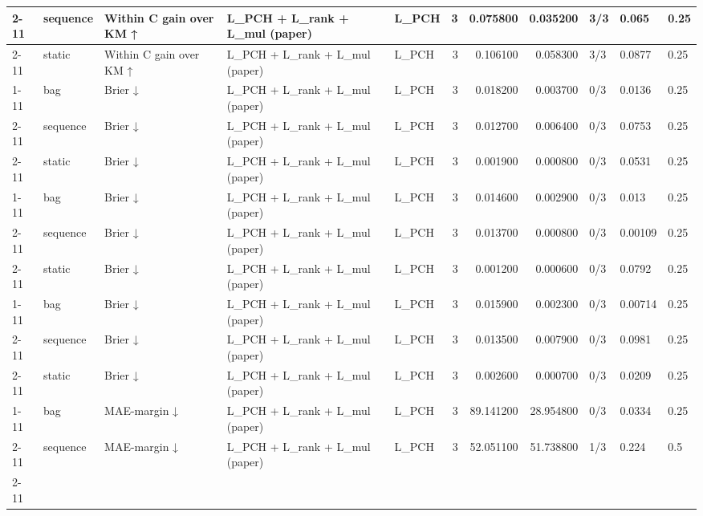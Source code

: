 \begin{tabular}{lllllrrrlll}
\cline{2-11} \cline{3-11}
 & sequence & Within C gain over KM ↑ & L\_PCH + L\_rank + L\_mul (paper) & L\_PCH & 3 & 0.075800 & 0.035200 & 3/3 & 0.065 & 0.25 \\
\cline{2-11} \cline{3-11}
 & static & Within C gain over KM ↑ & L\_PCH + L\_rank + L\_mul (paper) & L\_PCH & 3 & 0.106100 & 0.058300 & 3/3 & 0.0877 & 0.25 \\
\cline{1-11} \cline{2-11} \cline{3-11}
\multirow[t]{3}{*}{ehrsim\_base} & bag & Brier ↓ & L\_PCH + L\_rank + L\_mul (paper) & L\_PCH & 3 & 0.018200 & 0.003700 & 0/3 & 0.0136 & 0.25 \\
\cline{2-11} \cline{3-11}
 & sequence & Brier ↓ & L\_PCH + L\_rank + L\_mul (paper) & L\_PCH & 3 & 0.012700 & 0.006400 & 0/3 & 0.0753 & 0.25 \\
\cline{2-11} \cline{3-11}
 & static & Brier ↓ & L\_PCH + L\_rank + L\_mul (paper) & L\_PCH & 3 & 0.001900 & 0.000800 & 0/3 & 0.0531 & 0.25 \\
\cline{1-11} \cline{2-11} \cline{3-11}
\multirow[t]{3}{*}{ehrsim\_static} & bag & Brier ↓ & L\_PCH + L\_rank + L\_mul (paper) & L\_PCH & 3 & 0.014600 & 0.002900 & 0/3 & 0.013 & 0.25 \\
\cline{2-11} \cline{3-11}
 & sequence & Brier ↓ & L\_PCH + L\_rank + L\_mul (paper) & L\_PCH & 3 & 0.013700 & 0.000800 & 0/3 & 0.00109 & 0.25 \\
\cline{2-11} \cline{3-11}
 & static & Brier ↓ & L\_PCH + L\_rank + L\_mul (paper) & L\_PCH & 3 & 0.001200 & 0.000600 & 0/3 & 0.0792 & 0.25 \\
\cline{1-11} \cline{2-11} \cline{3-11}
\multirow[t]{3}{*}{ehrsim\_temporal} & bag & Brier ↓ & L\_PCH + L\_rank + L\_mul (paper) & L\_PCH & 3 & 0.015900 & 0.002300 & 0/3 & 0.00714 & 0.25 \\
\cline{2-11} \cline{3-11}
 & sequence & Brier ↓ & L\_PCH + L\_rank + L\_mul (paper) & L\_PCH & 3 & 0.013500 & 0.007900 & 0/3 & 0.0981 & 0.25 \\
\cline{2-11} \cline{3-11}
 & static & Brier ↓ & L\_PCH + L\_rank + L\_mul (paper) & L\_PCH & 3 & 0.002600 & 0.000700 & 0/3 & 0.0209 & 0.25 \\
\cline{1-11} \cline{2-11} \cline{3-11}
\multirow[t]{3}{*}{ehrsim\_base} & bag & MAE-margin ↓ & L\_PCH + L\_rank + L\_mul (paper) & L\_PCH & 3 & 89.141200 & 28.954800 & 0/3 & 0.0334 & 0.25 \\
\cline{2-11} \cline{3-11}
 & sequence & MAE-margin ↓ & L\_PCH + L\_rank + L\_mul (paper) & L\_PCH & 3 & 52.051100 & 51.738800 & 1/3 & 0.224 & 0.5 \\
\cline{2-11} \cline{3-11}

\end{tabular}
